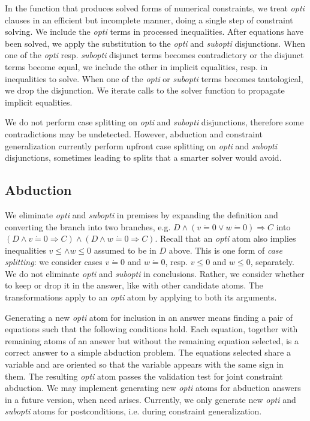 \documentclass{article}
\newcommand{\tmem}[1]{{\em #1\/}}
\begin{document}
In the function that produces solved forms of numerical constraints, we treat
{\tmem{opti}} clauses in an efficient but incomplete manner, doing a single
step of constraint solving. We include the {\tmem{opti}} terms in processed
inequalities. After equations have been solved, we apply the substitution to
the {\tmem{opti}} and {\tmem{subopti}} disjunctions. When one of the
{\tmem{opti}} resp. {\tmem{subopti}} disjunct terms becomes contradictory or
the disjunct terms become equal, we include the other in implicit equalities,
resp. in inequalities to solve. When one of the {\tmem{opti}} or
{\tmem{subopti}} terms becomes tautological, we drop the disjunction. We
iterate calls to the solver function to propagate implicit equalities.

We do not perform case splitting on {\tmem{opti}} and {\tmem{subopti}}
disjunctions, therefore some contradictions may be undetected. However,
abduction and constraint generalization currently perform upfront case
splitting on {\tmem{opti}} and {\tmem{subopti}} disjunctions, sometimes
leading to splits that a smarter solver would avoid.

\subsection{Abduction}

We eliminate {\tmem{opti}} and {\tmem{subopti}} in premises by expanding the
definition and converting the branch into two branches, e.g. $D \wedge (v
\dot{=} 0 \vee w \dot{=} 0) \Rightarrow C$ into $(D \wedge v \dot{=} 0
\Rightarrow C) \wedge (D \wedge w \dot{=} 0 \Rightarrow C)$. Recall that an
{\tmem{opti}} atom also implies inequalities $v \leqslant \wedge w \leqslant
0$ assumed to be in $D$ above. This is one form of {\tmem{case splitting}}: we
consider cases $v \dot{=} 0$ and $w \dot{=} 0$, resp. $v \leqslant 0$ and $w
\leqslant 0$, separately. We do not eliminate {\tmem{opti}} and
{\tmem{subopti}} in conclusions. Rather, we consider whether to keep or drop
it in the answer, like with other candidate atoms. The transformations apply
to an {\tmem{opti}} atom by applying to both its arguments.

Generating a new {\tmem{opti}} atom for inclusion in an answer means finding a
pair of equations such that the following conditions hold. Each equation,
together with remaining atoms of an answer but without the remaining equation
selected, is a correct answer to a simple abduction problem. The equations
selected share a variable and are oriented so that the variable appears with
the same sign in them. The resulting {\tmem{opti}} atom passes the validation
test for joint constraint abduction. We may implement generating new
{\tmem{opti}} atoms for abduction answers in a future version, when need
arises. Currently, we only generate new {\tmem{opti}} and {\tmem{subopti}}
atoms for postconditions, i.e. during constraint generalization.
\end{document}
